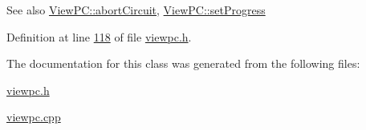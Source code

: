 \begin{DoxySeeAlso}{See also}
\hyperlink{class_view_p_c_ad7ba2fcf1d17862de15e32432823f7b0}{View\+P\+C\+::abort\+Circuit}, \hyperlink{class_view_p_c_a9c32a1fdb6ead84e5ada8fba8860c7ed}{View\+P\+C\+::set\+Progress} 
\end{DoxySeeAlso}


Definition at line \hyperlink{viewpc_8h_source_l00118}{118} of file \hyperlink{viewpc_8h_source}{viewpc.\+h}.



The documentation for this class was generated from the following files\+:\begin{DoxyCompactItemize}
\item 
\hyperlink{viewpc_8h}{viewpc.\+h}\item 
\hyperlink{viewpc_8cpp}{viewpc.\+cpp}\end{DoxyCompactItemize}
